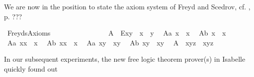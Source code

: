 \begin{isabellebody}
\begin{isamarkuptext}%
We are now in the position to state the axiom system of Freyd and Scedrov, 
cf. \cite{FreydScedrov90}, p. ???%
\end{isamarkuptext}%
\isamarkuptrue%
\isamarkupfalse%
\ FreydsAxioms\ \ \ \ \ \ \ \ \ \ \ \ \ \ \ \isanewline
\ A{}{\isacharcolon}\ \ {\isachardoublequoteopen}\isactrlbold E{\isacharparenleft}x{\isasymcdot}y{\isacharparenright}\ \isactrlbold {\isasymleftrightarrow}\ {\isacharparenleft}{\isacharparenleft}x{\isasymbox}{\isacharparenright}\ {\isasymapprox}\ {\isacharparenleft}{\isasymbox}y{\isacharparenright}{\isacharparenright}{\isachardoublequoteclose}\ \isanewline
\ A{}a{\isacharcolon}\ {\isachardoublequoteopen}{\isacharparenleft}{\isacharparenleft}{\isasymbox}x{\isacharparenright}{\isasymbox}{\isacharparenright}\ {\isasymapprox}\ {\isasymbox}x{\isachardoublequoteclose}\ \isanewline
\ A{}b{\isacharcolon}\ {\isachardoublequoteopen}{\isasymbox}{\isacharparenleft}x{\isasymbox}{\isacharparenright}\ {\isasymapprox}\ {\isasymbox}x{\isachardoublequoteclose}\ \isanewline
\ A{}a{\isacharcolon}\ {\isachardoublequoteopen}{\isacharparenleft}{\isasymbox}x{\isacharparenright}{\isasymcdot}x\ {\isasymapprox}\ x{\isachardoublequoteclose}\ \isanewline
\ A{}b{\isacharcolon}\ {\isachardoublequoteopen}x{\isasymcdot}{\isacharparenleft}x{\isasymbox}{\isacharparenright}\ {\isasymapprox}\ x{\isachardoublequoteclose}\ \isanewline
\ A{}a{\isacharcolon}\ {\isachardoublequoteopen}{\isasymbox}{\isacharparenleft}x{\isasymcdot}y{\isacharparenright}\ {\isasymapprox}\ {\isasymbox}{\isacharparenleft}x{\isasymcdot}{\isacharparenleft}{\isasymbox}y{\isacharparenright}{\isacharparenright}{\isachardoublequoteclose}\ \isanewline
\ A{}b{\isacharcolon}\ {\isachardoublequoteopen}{\isacharparenleft}x{\isasymcdot}y{\isacharparenright}{\isasymbox}\ {\isasymapprox}\ {\isacharparenleft}{\isacharparenleft}x{\isasymbox}{\isacharparenright}{\isasymcdot}y{\isacharparenright}{\isasymbox}{\isachardoublequoteclose}\ \isanewline
\ A{}{\isacharcolon}\ \ {\isachardoublequoteopen}x{\isasymcdot}{\isacharparenleft}y{\isasymcdot}z{\isacharparenright}\ {\isasymapprox}\ {\isacharparenleft}x{\isasymcdot}y{\isacharparenright}{\isasymcdot}z{\isachardoublequoteclose}%
\begin{isamarkuptext}%
In our subsequent experiments, the new free logic theorem prover(s) in Isabelle quickly found out 

\end{isamarkuptext}
\end{isabellebody}
